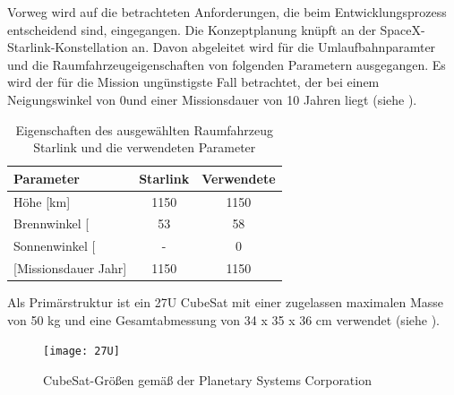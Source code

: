 	Vorweg wird auf die betrachteten Anforderungen, die beim Entwicklungsprozess entscheidend  sind, eingegangen. Die Konzeptplanung knüpft an der SpaceX-Starlink-Konstellation an. Davon abgeleitet wird für die Umlaufbahnparamter und die Raumfahrzeugeigenschaften von folgenden Parametern ausgegangen. Es wird der für die Mission ungünstigste Fall betrachtet, der bei einem Neigungswinkel von 0\textdegree und einer Missionsdauer von 10 Jahren liegt (siehe ).
\begin{table}[!h]
\centering
	\begin{tabular}{|l|c|c|}
\hline
\multicolumn{1}{|l|}{Parameter}          & \multicolumn{1}{l|}{Starlink} & \multicolumn{1}{l|}{Verwendete} \\ \hline
\multicolumn{1}{|l|}{Höhe {[}km{]}}      & \multicolumn{1}{c|}{1150}     & \multicolumn{1}{c|}{1150}       \\ \hline
\multicolumn{1}{|l|}{Brennwinkel {[}\textdegree{]}} & \multicolumn{1}{c|}{53}       & \multicolumn{1}{c|}{58}       \\ \hline
\multicolumn{1}{|l|}{Sonnenwinkel {[}\textdegree{]}}       & \multicolumn{1}{c|}{-}        & \multicolumn{1}{c|}{0}          \\ \hline
\multicolumn{1}{|l|}{ {[}Missionsdauer {Jahr]}}      & \multicolumn{1}{c|}{1150}     & \multicolumn{1}{c|}{1150}       \\ \hline
          
	\end{tabular}
	\caption{Eigenschaften des ausgewählten Raumfahrzeug Starlink und die verwendeten Parameter \cite{Lettau.}}
	\label{tab:parameter}
\end{table}

	
	Als Primärstruktur ist ein 27U CubeSat mit einer zugelassen maximalen Masse von 50 kg und eine Gesamtabmessung von 34 x 35 x 36 cm verwendet (siehe ). 				
				\begin{figure}[!h]
					\centering
						\texttt{[image: 27U]}
					\caption{CubeSat-Größen gemäß der Planetary Systems Corporation \cite{Lettau.}}
					\label{fig:27U}
				\end{figure}


